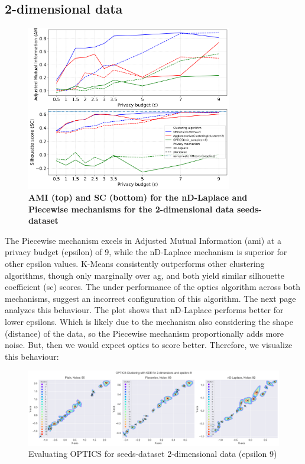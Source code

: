 \subsection{2-dimensional data \label{section:cluster-utility-2}}
\begin{figure}[H]
  \centering
  \caption{\textbf{AMI (top) and SC (bottom) for the nD-Laplace and Piecewise mechanisms for the 2-dimensional data seeds-dataset}}
  \includegraphics[width=0.8\textwidth]{Results/nd-laplace/nd-Laplace/seeds-dataset/ami-and-sc_2_dimensions.png}

  \label{fig:validation-seeds-dataset_comparison_2d-laplace}
\end{figure}
The Piecewise mechanism excels in Adjusted Mutual Information (\gls{ami}) at a privacy budget (epsilon) of 9, while the nD-Laplace mechanism is superior for other epsilon values. K-Means consistently outperforms other clustering algorithms, though only marginally over \gls{ag}, and both yield similar silhouette coefficient (\gls{sc}) scores. The under performance of the \gls{optics} algorithm across both mechanisms, suggest an incorrect configuration of this algorithm. The next page analyzes this behaviour.
\newpage
The plot shows that nD-Laplace performs better for lower epsilons. Which is likely due to the mechanism also considering the shape (distance) of the data, so the Piecewise mechanism proportionally adds more noise. But, then we would expect \gls{optics} to score better. Therefore, we visualize this behaviour:
\begin{figure}[H]
  \centering
  \includegraphics[width=1\linewidth]{Discussion/behaviour-2d-seeds-dataset&optics.png}
  \caption{Evaluating OPTICS for seeds-dataset 2-dimensional data (epsilon 9)}
  \label{fig:evaluate-optics-seeds-dataset-2d-9eps}
\end{figure}
